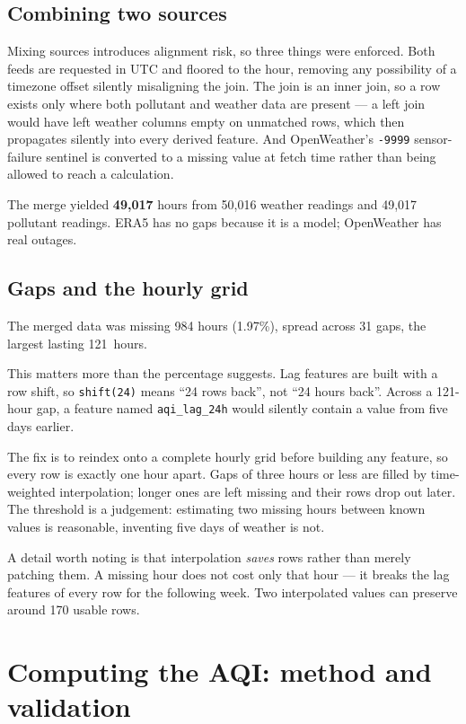 \documentclass[11pt,a4paper]{article}
\begin{document}
\subsection{Combining two sources}

Mixing sources introduces alignment risk, so three things were enforced.
Both feeds are requested in UTC and floored to the hour, removing any
possibility of a timezone offset silently misaligning the join. The join
is an inner join, so a row exists only where both pollutant and weather
data are present --- a left join would have left weather columns empty
on unmatched rows, which then propagates silently into every derived
feature. And OpenWeather's \texttt{-9999} sensor-failure sentinel is
converted to a missing value at fetch time rather than being allowed to
reach a calculation.

The merge yielded \textbf{49,017} hours from 50,016 weather readings and
49,017 pollutant readings. ERA5 has no gaps because it is a model;
OpenWeather has real outages.

\subsection{Gaps and the hourly grid}

The merged data was missing 984 hours (1.97\%), spread across 31 gaps,
the largest lasting 121~hours.

This matters more than the percentage suggests. Lag features are built
with a row shift, so \texttt{shift(24)} means ``24 rows back'', not
``24 hours back''. Across a 121-hour gap, a feature named
\texttt{aqi\_lag\_24h} would silently contain a value from five days
earlier.

The fix is to reindex onto a complete hourly grid before building any
feature, so every row is exactly one hour apart. Gaps of three hours or
less are filled by time-weighted interpolation; longer ones are left
missing and their rows drop out later. The threshold is a judgement:
estimating two missing hours between known values is reasonable,
inventing five days of weather is not.

A detail worth noting is that interpolation \emph{saves} rows rather
than merely patching them. A missing hour does not cost only that hour
--- it breaks the lag features of every row for the following week. Two
interpolated values can preserve around 170 usable rows.

\section{Computing the AQI: method and validation}
\label{sec:aqi}
\end{document}

